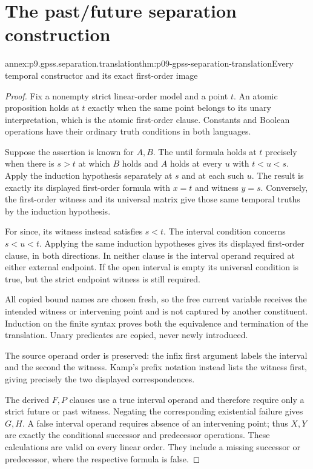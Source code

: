 
\section{The past/future separation construction}
\label{sec:annex-p09-gpss-past-future-separation}

\begin{annexitem}{annex:p9.gpss.separation.translation}{thm:p09-gpss-separation-translation}{Every temporal constructor and its exact first-order image}
\begin{proof}
Fix a nonempty strict linear-order model and a point \(t\).
An atomic proposition holds at \(t\) exactly when the same
point belongs to its unary interpretation, which is the
atomic first-order clause. Constants and Boolean operations
have their ordinary truth conditions in both languages.

Suppose the assertion is known for \(A,B\).
The until formula holds at \(t\) precisely when there
is \(s>t\) at which \(B\) holds and \(A\) holds at
every \(u\) with \(t<u<s\). Apply the induction
hypothesis separately at \(s\) and at each such \(u\).
The result is exactly its displayed first-order formula
with \(x=t\) and witness \(y=s\). Conversely, the
first-order witness and its universal matrix give
those same temporal truths by the induction hypothesis.

For since, its witness instead satisfies \(s<t\).
The interval condition concerns \(s<u<t\).
Applying the same induction hypotheses gives its
displayed first-order clause, in both directions.
In neither clause is the interval operand required
at either external endpoint. If the open interval
is empty its universal condition is true, but the
strict endpoint witness is still required.

All copied bound names are chosen fresh, so the
free current variable receives the intended witness
or intervening point and is not captured by another
constituent. Induction on the finite syntax proves
both the equivalence and termination of the translation.
Unary predicates are copied, never newly introduced.

The source operand order is preserved: the infix
first argument labels the interval and the second
the witness. Kamp's prefix notation instead lists
the witness first, giving precisely the two
displayed correspondences.

The derived \(F,P\) clauses use a true interval
operand and therefore require only a strict future
or past witness. Negating the corresponding
existential failure gives \(G,H\). A false
interval operand requires absence of an intervening
point; thus \(X,Y\) are exactly the conditional
successor and predecessor operations. These
calculations are valid on every linear order.
They include a missing successor or predecessor,
where the respective formula is false.


\end{proof}
\end{annexitem}
